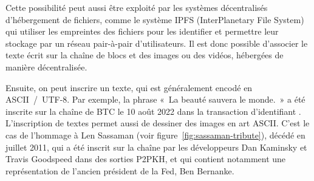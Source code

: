 Cette possibilité peut aussi être exploité par les systèmes décentralisés d'hébergement de fichiers, comme le système IPFS (InterPlanetary File System) qui utiliser les empreintes des fichiers pour les identifier et permettre leur stockage par un réseau pair-à-pair d'utilisateurs. Il est donc possible d'associer le texte écrit sur la chaîne de blocs et des images ou des vidéos, hébergées de manière décentralisée.

Ensuite, on peut inscrire un texte, qui est généralement encodé en ASCII~/~UTF-8. Par exemple, la phrase «~La beauté sauvera le monde.~» a été inscrite sur la chaîne de BTC le 10 août 2022 dans la transaction d'identifiant . L'inscription de textes permet aussi de dessiner des images en art ASCII. C'est le cas de l'hommage à Len Sassaman (voir figure~\ref{fig:sassaman-tribute}), décédé en juillet 2011, qui a été inscrit sur la chaîne par les développeurs Dan Kaminsky et Travis Goodspeed dans des sorties P2PKH, et qui contient notamment une représentation de l'ancien président de la Fed, Ben Bernanke.

